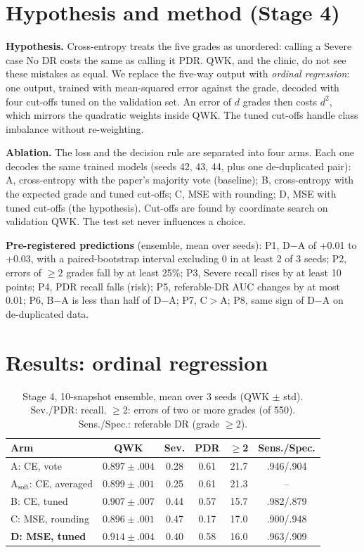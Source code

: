 \documentclass[conference]{IEEEtran}
\begin{document}
\section{Hypothesis and method (Stage 4)}
\textbf{Hypothesis.} Cross-entropy treats the five grades as unordered: calling a Severe case No DR costs the same as
calling it PDR. QWK, and the clinic, do not see these mistakes as equal. We replace the five-way output with
\emph{ordinal regression}: one output, trained with mean-squared error against the grade, decoded with four cut-offs
tuned on the validation set. An error of $d$ grades then costs $d^2$, which mirrors the quadratic weights inside QWK.
The tuned cut-offs handle class imbalance without re-weighting.

\textbf{Ablation.} The loss and the decision rule are separated into four arms. Each one decodes the same trained
models (seeds 42, 43, 44, plus one de-duplicated pair):
A, cross-entropy with the paper's majority vote (baseline);
B, cross-entropy with the expected grade and tuned cut-offs;
C, MSE with rounding;
D, MSE with tuned cut-offs (the hypothesis).
Cut-offs are found by coordinate search on validation QWK. The test set never influences a choice.

\textbf{Pre-registered predictions} (ensemble, mean over seeds):
P1, D$-$A of +0.01 to +0.03, with a paired-bootstrap interval excluding 0 in at least 2 of 3 seeds;
P2, errors of $\ge2$ grades fall by at least 25\%;
P3, Severe recall rises by at least 10 points;
P4, PDR recall falls (risk);
P5, referable-DR AUC changes by at most 0.01;
P6, B$-$A is less than half of D$-$A;
P7, C$>$A;
P8, same sign of D$-$A on de-duplicated data.

\section{Results: ordinal regression}
\begin{table}[t]
\centering
\caption{Stage 4, 10-snapshot ensemble, mean over 3 seeds (QWK $\pm$ std). Sev./PDR: recall. $\ge$2: errors of two
or more grades (of 550). Sens./Spec.: referable DR (grade $\ge2$).}
\label{tab:stage4}
\small
\setlength{\tabcolsep}{3pt}
\begin{tabular}{@{}lccccc@{}}
\toprule
Arm & QWK & Sev. & PDR & $\ge$2 & Sens./Spec. \\
\midrule
A: CE, vote & $0.897\pm.004$ & 0.28 & 0.61 & 21.7 & .946/.904 \\
A$_\text{soft}$: CE, averaged & $0.899\pm.001$ & 0.25 & 0.61 & 21.3 & -- \\
B: CE, tuned & $0.907\pm.007$ & 0.44 & 0.57 & 15.7 & .982/.879 \\
C: MSE, rounding & $0.896\pm.001$ & 0.47 & 0.17 & 17.0 & .900/.948 \\
\textbf{D: MSE, tuned} & $\mathbf{0.914\pm.004}$ & 0.40 & 0.58 & 16.0 & .963/.909 \\
\bottomrule
\end{tabular}
\end{table}
\end{document}
